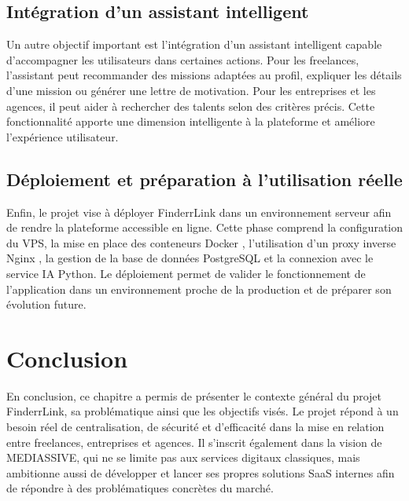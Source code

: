 \subsection{Intégration d'un assistant intelligent}

Un autre objectif important est l'intégration d'un assistant intelligent capable d'accompagner les utilisateurs dans certaines actions. Pour les freelances, l'assistant peut recommander des missions adaptées au profil, expliquer les détails d'une mission ou générer une lettre de motivation. Pour les entreprises et les agences, il peut aider à rechercher des talents selon des critères précis. Cette fonctionnalité apporte une dimension intelligente à la plateforme et améliore l'expérience utilisateur.

\subsection{Déploiement et préparation à l'utilisation réelle}

Enfin, le projet vise à déployer FinderrLink dans un environnement serveur afin de rendre la plateforme accessible en ligne. Cette phase comprend la configuration du VPS, la mise en place des conteneurs Docker \cite{docker}, l'utilisation d'un proxy inverse Nginx \cite{nginx}, la gestion de la base de données PostgreSQL \cite{postgresql} et la connexion avec le service IA Python. Le déploiement permet de valider le fonctionnement de l'application dans un environnement proche de la production et de préparer son évolution future.
\section{Conclusion}

En conclusion, ce chapitre a permis de présenter le contexte général du projet FinderrLink, sa problématique ainsi que les objectifs visés. Le projet répond à un besoin réel de centralisation, de sécurité et d’efficacité dans la mise en relation entre freelances, entreprises et agences. Il s’inscrit également dans la vision de MEDIASSIVE, qui ne se limite pas aux services digitaux classiques, mais ambitionne aussi de développer et lancer ses propres solutions SaaS internes afin de répondre à des problématiques concrètes du marché.

